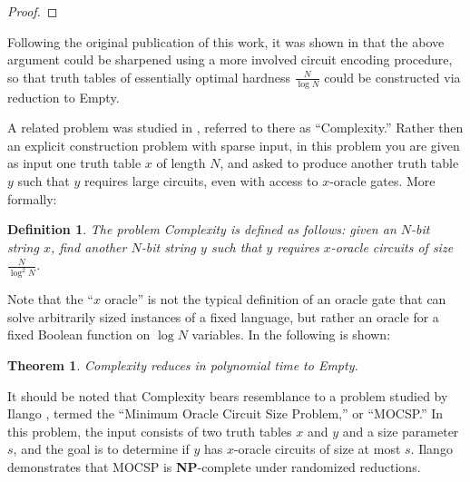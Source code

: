 \documentclass[11pt]{article}
\newtheorem{theorem}{Theorem}
\newtheorem{definition}{Definition}
\def\cl{\bf}
\begin{document}
\begin{proof}

\end{proof}

Following the original publication of this work, it was shown in \cite{CHR} that the above argument could be sharpened using a more involved circuit encoding procedure, so that truth tables of essentially optimal hardness $\frac{N}{\log N}$ could be constructed via reduction to {\sc Empty}.

A related problem was studied in \cite{total}, referred to there as ``{\sc Complexity}.'' Rather then an explicit construction problem with sparse input, in this problem you are given as input one truth table $x$ of length $N$, and asked to produce another truth table $y$ such that $y$ requires large circuits, even with access to $x$-oracle gates. More formally:

\begin{definition}\label{def:complexity}
The problem {\sc Complexity} is defined as follows: given an $N$-bit string $x$, find another $N$-bit string $y$ such that $y$ requires $x$-oracle circuits of size $\frac{N}{\log^2 N}$.
\end{definition}
Note that the ``$x$ oracle'' is not the typical definition of an oracle gate that can solve arbitrarily sized instances of a fixed language, but rather an oracle for a fixed Boolean function on $\log N$ variables. 
In \cite{total} the following is shown:
\begin{theorem}
{\sc Complexity} reduces in polynomial time to {\sc Empty}.
\end{theorem}
It should be noted that {\sc Complexity} bears resemblance to a problem studied by Ilango \cite{Ilango}, termed the ``Minimum Oracle Circuit Size Problem,'' or ``MOCSP.'' In this problem, the input consists of two truth tables $x$ and $y$ and a size parameter $s$, and the goal is to determine if $y$ has $x$-oracle circuits of size at most $s$. Ilango demonstrates that MOCSP is {\cl NP}-complete under randomized reductions.
\end{document}
